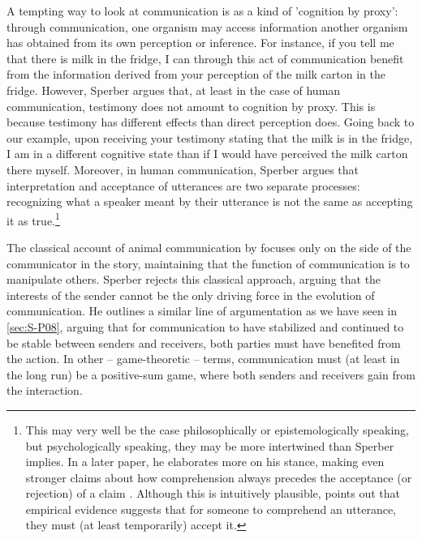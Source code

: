 A tempting way to look at communication is as a kind of 'cognition by proxy': through communication, one organism may access information another organism has obtained from its own perception or inference.
For instance, if you tell me that there is milk in the fridge, I can through this act of communication benefit from the information derived from your perception of the milk carton in the fridge.
However, Sperber argues that, at least in the case of human communication, testimony does not amount to cognition by proxy. This is because testimony has different effects than direct perception does. Going back to our example, upon receiving your testimony stating that the milk is in the fridge, I am in a different cognitive state than if I would have perceived the milk carton there myself. Moreover, in human communication, Sperber argues that interpretation and acceptance of utterances are two separate processes: recognizing what a speaker meant by their utterance is not the same as accepting it as true.\footnote{This may very well be the case philosophically or epistemologically speaking, but psychologically speaking, they may be more intertwined than Sperber implies. In a later paper, he elaborates more on his stance, making even stronger claims about how comprehension always precedes the acceptance (or rejection) of a claim \citep[\S 3]{Sperber10}. Although this is intuitively plausible, \citet{Lewandowsky12} points out that empirical evidence suggests that for someone to comprehend an utterance, they must (at least temporarily) accept it.}

The classical account of animal communication by \citet{DawkinsKrebs78} focuses only on the side of the communicator in the story, maintaining that the function of communication is to manipulate others. Sperber rejects this classical approach, arguing that the interests of the sender cannot be the only driving force in the evolution of communication.
He outlines a similar line of argumentation as we have seen in \cref{sec:S-P08},
arguing that for communication to have stabilized and continued to be stable between senders and receivers, both parties must have benefited from the action. In other -- game-theoretic -- terms, communication must (at least in the long run) be a positive-sum game, where both senders and receivers gain from the interaction.

